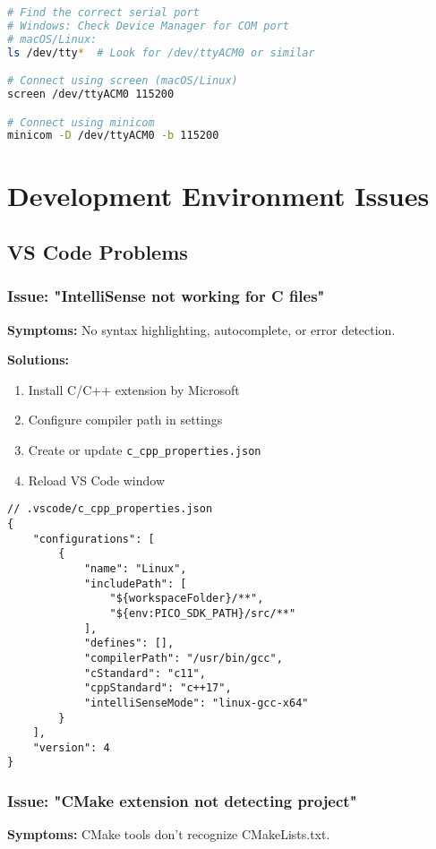\documentclass[11pt,a4paper]{article}
\begin{document}
\begin{lstlisting}[language=bash]
# Find the correct serial port
# Windows: Check Device Manager for COM port
# macOS/Linux:
ls /dev/tty*  # Look for /dev/ttyACM0 or similar

# Connect using screen (macOS/Linux)
screen /dev/ttyACM0 115200

# Connect using minicom
minicom -D /dev/ttyACM0 -b 115200
\end{lstlisting}

\section{Development Environment Issues}

\subsection{VS Code Problems}

\subsubsection{Issue: "IntelliSense not working for C files"}
\textbf{Symptoms:} No syntax highlighting, autocomplete, or error detection.

\textbf{Solutions:}
\begin{enumerate}
    \item Install C/C++ extension by Microsoft
    \item Configure compiler path in settings
    \item Create or update \texttt{c\_cpp\_properties.json}
    \item Reload VS Code window
\end{enumerate}

\begin{lstlisting}
// .vscode/c_cpp_properties.json
{
    "configurations": [
        {
            "name": "Linux",
            "includePath": [
                "${workspaceFolder}/**",
                "${env:PICO_SDK_PATH}/src/**"
            ],
            "defines": [],
            "compilerPath": "/usr/bin/gcc",
            "cStandard": "c11",
            "cppStandard": "c++17",
            "intelliSenseMode": "linux-gcc-x64"
        }
    ],
    "version": 4
}
\end{lstlisting}

\subsubsection{Issue: "CMake extension not detecting project"}
\textbf{Symptoms:} CMake tools don't recognize CMakeLists.txt.
\end{document}
